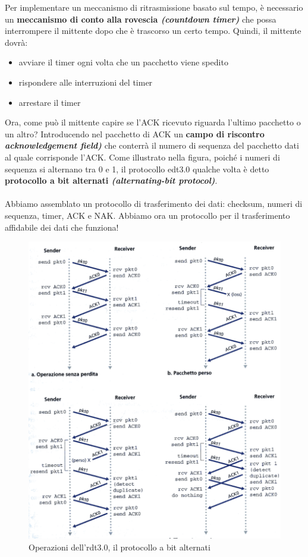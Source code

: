 \documentclass[11pt,a4paper]{book}
\begin{document}
Per implementare un meccanismo di ritrasmissione basato sul tempo, è necessario un \textbf{meccanismo di conto alla rovescia \textit{(countdown timer)}} che possa interrompere il mittente dopo che è trascorso un certo tempo. Quindi, il mittente dovrà:
\begin{itemize}
	\item avviare il timer ogni volta che un pacchetto viene spedito
	\item rispondere alle interruzioni del timer
	\item arrestare il timer
\end{itemize}
Ora, come può il mittente capire se l'ACK ricevuto riguarda l'ultimo pacchetto o un altro? Introducendo nel pacchetto di ACK un \textbf{campo di riscontro \textit{acknowledgement field)}} che conterrà il numero di sequenza del pacchetto dati al quale corrisponde l'ACK.
Come illustrato nella figura, poiché i numeri di sequenza si alternano tra 0 e 1, il protocollo edt3.0 qualche volta è detto \textbf{protocollo a bit alternati \textit{(alternating-bit protocol)}}. \\ \\
Abbiamo assemblato un protocollo di trasferimento dei dati: checksum, numeri di sequenza, timer, ACK e NAK. Abbiamo ora un protocollo per il trasferimento affidabile dei dati che funziona!
\begin{figure}
	\includegraphics[scale=0.6]{img/022.png}
	\caption{Operazioni dell'rdt3.0, il protocollo a bit alternati}
\end{figure}
\end{document}
